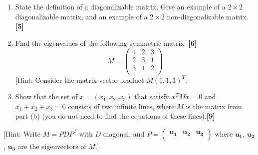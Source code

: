 \documentclass[a4paper]{article}
\begin{document}
\newpage
\begin{qns}\leavevmode
\begin{enumerate}[label=(\alph*)]
\item State the definition of a diagonalizable matrix. Give an example of a $2\times 2$ diagonalizable matrix, and an example of a $2\times 2$ non-diagonalizable matrix. \hfill\textbf{[5]}
\item Find the eigenvalues of the following symmetric matrix: \hfill\textbf{[6]}
$$M=\begin{pmatrix}1&2&3\\2&3&1\\3&1&2\\\end{pmatrix}$$
[Hint: Consider the matrix vector product $M(1,1,1)^T$.
\item Show that the set of $x = (x_1, x_2, x_3)$ that satisfy $x^TMx = 0$ and $x_1 + x_2 + x_3 = 0$ consists of two infinite lines, where $M$ is the matrix from part (b) (you do not need to find the equations of these lines).\hfill\textbf{[9]}
\end{enumerate}
[Hint: Write $M = PDP^T$ with $D$ diagonal, and $P = \begin{pmatrix}\mathbf{u_1}&\mathbf{u_2}&\mathbf{u_3}\\\end{pmatrix}$ where $\mathbf{u_1}$, $\mathbf{u_2}$, $\mathbf{u_3}$ are the eigenvectors of $M$.]
\end{qns}
\end{document}
